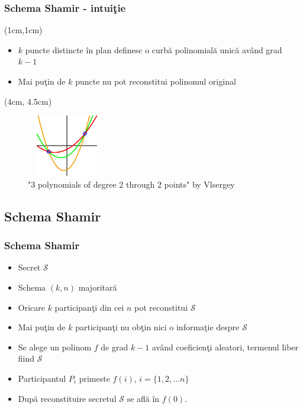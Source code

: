\documentclass{beamer}
\theoremstyle{definition}
\begin{document}
\begin{frame}
    \frametitle{Schema Shamir - intui\c{t}ie}
     {
        \begin{textblock*}{12cm}(1cm,1cm)
            \begin{itemize}
                \item $k$ puncte distincte \^{i}n plan definesc o curb\u{a} polinomial\u{a} unic\u{a} av\^{a}nd grad $k - 1$
                \item Mai pu\c{t}in de $k$ puncte nu pot reconstitui polinomul original
            \end{itemize}
        \end{textblock*}
    }
     {
        \begin{textblock*}{4cm}(4cm, 4.5cm)
        \begin{figure}
            \includegraphics[width=3.5cm,height=2.7cm,keepaspectratio]{img/shamir/shamir.png}
            \caption{"3 polynomials of degree 2 through 2 points" by Vlsergey}
        \end{figure}
        \end{textblock*}
     }
\end{frame}

\subsection{Schema Shamir}
\begin{frame}
    \frametitle{Schema Shamir}
    \begin{itemize}
        \item Secret $\mathcal{S}$
        \pause
        \item Schema $(k,n)$ majoritar\u{a}
        \pause
        \item Oricare $k$ participan\c{t}i din cei $n$ pot reconstitui $\mathcal{S}$
        \pause
        \item Mai pu\c{t}in de $k$ participan\c{t}i nu ob\c{t}in nici o informa\c{t}ie despre $\mathcal{S}$
        \pause
        \item Se alege un polinom $f$ de grad $k - 1$ av\^{a}nd coeficien\c{t}i aleatori, termenul liber fiind $\mathcal{S}$
        \pause
        \item Participantul $P_i$ primeste $f(i)$, $i = \{1, 2, ...n\}$
        \pause
        \item Dup\u{a} reconstituire secretul $\mathcal{S}$ se afl\u{a} \^{i}n $f(0)$.
    \end{itemize}
\end{frame}
\end{document}
